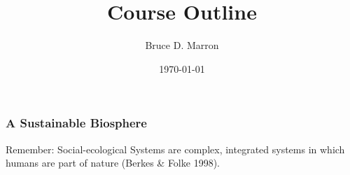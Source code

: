 \documentclass[12pt, letterpaper]{article}
\title{\vspace{-15mm}\fontsize{14pt}{10pt}
                    \selectfont \textbf{Course Outline}   %
                    \vspace{-7mm}
      }
\author{
     \normalsize Bruce D. Marron \\                     %
     \vspace{-5mm}
}
\date{\normalsize \today}
\begin{document}
\begin{singlespacing}
\end{singlespacing}
\thispagestyle{fancy}                           %

\setcounter{subsubsection}{3} %

\subsubsection{A Sustainable Biosphere}
Remember: Social-ecological Systems are complex, integrated systems in which humans are part of nature (Berkes \& Folke 1998).
\end{document}
